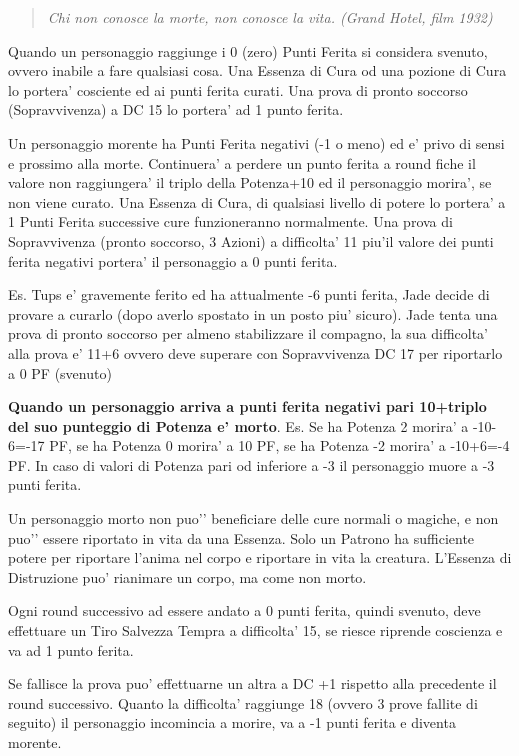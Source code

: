\documentclass[a4paper,11pt,twoside,openany]{book}
\begin{document}
\label{vita-e-morte}
\begin{quote}\textit{Chi non conosce la morte, non conosce la vita. (Grand Hotel, film 1932)
}\end{quote}

Quando un personaggio raggiunge i 0 (zero) Punti Ferita si considera svenuto, ovvero inabile a fare qualsiasi cosa. Una Essenza di Cura od una pozione di Cura lo portera’ cosciente ed ai punti ferita curati. Una prova di pronto soccorso (Sopravvivenza) a DC 15 lo portera’ ad 1 punto ferita.

Un personaggio morente ha Punti Ferita negativi (-1 o meno) ed e' privo di sensi e prossimo alla morte. Continuera’ a perdere un punto ferita a round fiche il valore non raggiungera’ il triplo della Potenza+10 ed il personaggio morira’, se non viene curato.
Una Essenza di Cura, di qualsiasi livello di potere lo portera’ a 1 Punti Ferita successive cure funzioneranno normalmente.
Una prova di Sopravvivenza (pronto soccorso, 3 Azioni) a difficolta’ 11 piu’il valore dei punti ferita negativi portera’ il personaggio a 0 punti ferita.

Es. Tups e’ gravemente ferito ed ha attualmente -6 punti ferita, Jade decide di provare a curarlo (dopo averlo spostato in un posto piu’ sicuro). Jade tenta una prova di pronto soccorso per almeno stabilizzare il compagno, la sua difficolta’ alla prova e’ 11+6 ovvero deve superare con Sopravvivenza DC 17 per riportarlo a 0 PF (svenuto)

\textbf{Quando un personaggio arriva a punti ferita negativi pari 10+triplo del suo punteggio di Potenza e’ morto}. Es. Se ha Potenza 2 morira’ a -10-6=-17 PF, se ha Potenza 0 morira’ a 10 PF, se ha Potenza -2 morira’ a -10+6=-4 PF. In caso di valori di Potenza pari od inferiore a -3 il personaggio muore a -3 punti ferita.

\bigskip

Un personaggio morto non puo'’ beneficiare delle cure normali o magiche, e non puo'’ essere riportato in vita da una Essenza. Solo un Patrono ha sufficiente potere per riportare l’anima nel corpo e riportare in vita la creatura. L’Essenza di Distruzione puo' rianimare un corpo, ma come non morto.

Ogni round successivo ad essere andato a 0 punti ferita, quindi svenuto, deve effettuare un Tiro Salvezza Tempra a difficolta’ 15, se riesce riprende coscienza e va ad 1 punto ferita.

Se fallisce la prova puo’ effettuarne un altra a DC +1 rispetto alla precedente il round successivo. Quanto la difficolta’ raggiunge 18 (ovvero 3 prove fallite di seguito) il personaggio incomincia a morire, va a -1 punti ferita e diventa morente.
\end{document}
